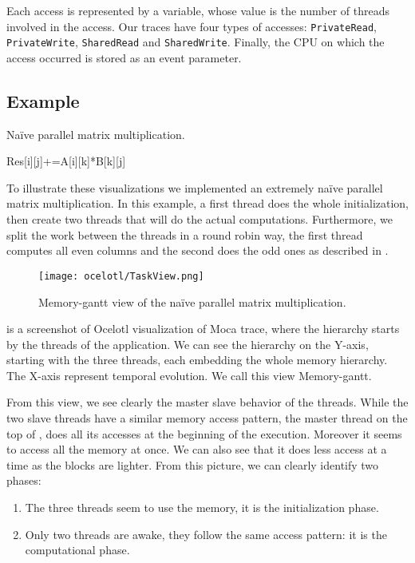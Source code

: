 Each access is represented by a variable, whose value is the number of threads involved in the access.
Our traces have four types of accesses: \texttt{PrivateRead}, \texttt{PrivateWrite}, \texttt{SharedRead} and \texttt{SharedWrite}.
Finally, the \gls{CPU} on which the access occurred is stored as an event parameter.

\subsection{Example}

\begin{algorithm}
    \caption{Naïve parallel matrix multiplication.}
    \label{alg:mat-par}
    \begin{algorithmic}
                    \State Res[i][j]+=A[i][k]*B[k][j]
                \EndFor
            \EndFor
        \EndFor
    \end{algorithmic}
\end{algorithm}

To illustrate these visualizations we implemented an extremely naïve parallel matrix multiplication.
In this example, a first thread does the whole initialization, then create two threads that will do the actual computations.
Furthermore, we split the work between the threads in a round robin way, the first thread computes all even columns and the second does the odd ones as described in .

\begin{figure}[htb]
    \centering
    \texttt{[image: ocelotl/TaskView.png]}
    \caption{Memory-gantt view of the naïve parallel matrix multiplication.}
    \label{fig:ocelotl-th0}
\end{figure}

 is a screenshot of \gls{Ocelotl} visualization of \gls{Moca} trace, where the hierarchy starts by the threads of the application.
We can see the hierarchy on the Y-axis, starting with the three threads, each embedding the whole memory hierarchy.
The X-axis represent temporal evolution.
We call this view Memory-gantt.

From this view, we see clearly the master slave behavior of the threads.
While the two slave threads have a similar memory access pattern, the master thread on the top of , does all its accesses at the beginning of the execution.
Moreover it seems to access all the memory at once.
We can also see that it does less access at a time as the blocks are lighter.
From this picture, we can clearly identify two phases:
\begin{enumerate}
    \item The three threads seem to use the memory, it is the initialization phase.
    \item Only two threads are awake, they follow the same access pattern: it
        is the computational phase.
\end{enumerate}


